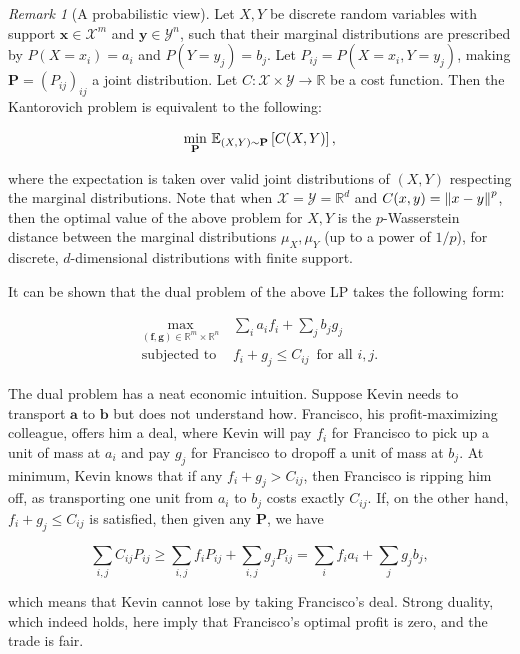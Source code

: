 \documentclass[11pt,reqno]{amsart}
\renewcommand{\b}{\mathbf}
\newcommand{\R}{\mathbb{R}}
\newcommand{\E}{\mathbb{E}}
\theoremstyle{definition}
\theoremstyle{remark}
\newtheorem{rmk}{Remark}
\begin{document}
\begin{rmk}[A probabilistic view]
Let $X,Y$ be discrete random variables with support $\b x \in \mathcal X^m$ and
$\b y \in \mathcal Y^n$, such that their marginal distributions are prescribed
by $P(X = x_i) = a_i$ and $P(Y = y_j) = b_j$. Let $P_{ij} = P(X = x_i, Y =
y_j)$, making $\b P = (P_{ij})_ {ij}$ a joint distribution. Let $C: \mathcal X
\times \mathcal Y \to \R$ be a cost function. Then the Kantorovich problem is
equivalent to the following:

\[ \min_{\b P}\, \E_{(X,Y) \sim \b P}\bk{C(X,Y)}, \]

where the expectation is taken over valid joint distributions of $(X,Y)$
respecting the marginal distributions. Note that when $\mathcal X = \mathcal Y =
\R^d$ and $C(x,y) = \left\lVert x-y\right\rVert^p$, then the optimal value of the above problem
for $X,Y$ is the $p$-Wasserstein distance between the marginal distributions
$\mu_X,\mu_Y$ (up to a power of $1/p$), for discrete, $d$-dimensional
distributions with finite support.
\end{rmk}

It can be shown that the dual problem of the above LP takes the following form:

\begin{align*}
\max_{(\b f, \b g) \in \R^{m} \times \R^n} \, & \sum_i a_i f_i + \sum_j b_j g_j
\\ 
\text{subjected to } & f_i + g_j \le C_{ij}\, \text{ for all $i,j$}.
\end{align*}

The dual problem has a neat economic intuition. Suppose Kevin needs to transport
$\b a$ to $\b b$ but does not understand how. Francisco, his profit-maximizing
colleague, offers him a deal, where Kevin will pay $f_i$ for Francisco to pick
up a unit of mass at $a_i$ and pay $g_j$ for Francisco to dropoff a unit of mass
at $b_j.$ At minimum, Kevin knows that if any $f_i + g_j > C_ {ij}$, then
Francisco is ripping him off, as transporting one unit from $a_i$ to $b_j$ costs
exactly $C_{ij}$. If, on the other hand, $f_i + g_j \le C_{ij}$ is satisfied,
then given any $\b P$, we have

\[
\sum_{i,j} C_{ij}P_{ij} \ge \sum_{i,j} f_i P_{ij} + \sum_{i,j} g_j P_{ij} =
\sum_i f_i a_i + \sum_j g_j b_j \tag{Weak duality},
\]


which means that Kevin cannot lose by taking Francisco's deal. Strong duality,
which indeed holds, here imply that Francisco's optimal profit is zero, and the
trade is fair.
\end{document}

